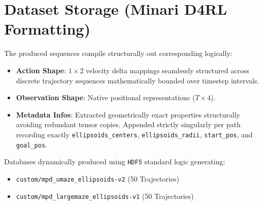 \documentclass[11pt]{article}
\begin{document}
\section{Dataset Storage (Minari D4RL Formatting)}
The produced sequences compile structurally out corresponding logically:
\begin{itemize}
    \item \textbf{Action Shape}: $1 \times 2$ velocity delta mappings seamlessly structured across discrete trajectory sequences mathematically bounded over timestep intervals.
    \item \textbf{Observation Shape}: Native positional representations ($T \times 4$). 
    \item \textbf{Metadata Infos}: Extracted geometrically exact properties structurally avoiding redundant tensor copies. Appended strictly singularly per path recording exactly \texttt{ellipsoids\_centers}, \texttt{ellipsoids\_radii}, \texttt{start\_pos}, and \texttt{goal\_pos}.
\end{itemize}

Databases dynamically produced using \texttt{HDF5} standard logic generating:
\begin{itemize}
    \item \texttt{custom/mpd\_umaze\_ellipsoids-v2} (50 Trajectories)
    \item \texttt{custom/mpd\_largemaze\_ellipsoids-v1} (50 Trajectories)
\end{itemize}
\end{document}
